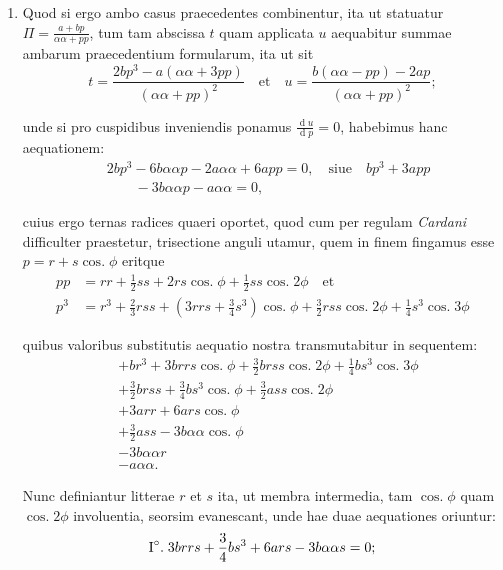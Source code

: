 \documentclass[10pt,a4paper]{article}
\DeclareMathOperator{\cosg}{cos.}
\begin{document}
\begin{paracol}{2}
\begin{enumerate}[topsep=1px]
		\item Quod si ergo ambo casus praecedentes combinentur, ita ut statuatur $\Pi=\frac{a + bp}{\alpha \alpha + pp}$, tum tam abscissa $t$ quam applicata $u$ aequabitur summae ambarum praecedentium formularum, ita ut sit
		\[
			t = \frac{2bp^3 - a(\alpha \alpha + 3pp)}{(\alpha \alpha + pp)^2} \quad \text{et} \quad u = \frac{b(\alpha \alpha - pp)-2ap}{(\alpha \alpha + pp)^2};
		\]
		\par unde si pro cuspidibus inveniendis ponamus $\frac{\operatorname{d}u}{\operatorname{d}p} = 0$, habebimus hanc aequationem:
		\begin{align*}
			&2bp^3-6b\alpha \alpha p -2a \alpha \alpha +6a pp = 0, \quad \text{siue} \quad bp^3+3app\\
			&\qquad-3b\alpha \alpha p - a\alpha \alpha = 0,
		\end{align*}
		\par cuius ergo ternas radices quaeri oportet, quod cum per regulam \textit{Cardani} difficulter praestetur, trisectione anguli utamur, quem in finem fingamus esse $p=r+s\cosg \phi$ eritque
		\begin{align*}
			pp & = rr + \frac{1}{2}ss +2rs \cosg\phi + \frac{1}{2}ss \cosg 2\phi \quad \text{et}\\
			p^3 & = r^3+\frac{2}{3}rss + (3rrs+\frac{3}{4}s^3)\cosg \phi + \frac{3}{2} rss \cosg 2\phi+\frac{1}{4}s^3\cosg 3\phi
		\end{align*}
		\par quibus valoribus substitutis aequatio nostra transmutabitur in sequentem:
		\begin{align*}
			&+br^3+3brrs \cosg \phi + \frac{3}{2}brss \cosg 2\phi+ \frac{1}{4}bs^3\cosg 3\phi\\
			&+\frac{3}{2}brss + \frac{3}{4}bs^3\cosg \phi + \frac{3}{2}ass \cosg 2\phi\\
			&+3arr + 6ars \cosg \phi\\
			&+\frac{3}{2}ass - 3b\alpha \alpha \cosg \phi\\
			&-3b\alpha \alpha r\\
			&-a \alpha \alpha.
		\end{align*}
		\par Nunc definiantur litterae $r$ et $s$ ita, ut membra intermedia, tam $\cosg \phi$ quam $\cosg 2\phi$ involuentia, seorsim evanescant, unde hae duae aequationes oriuntur:
		\begin{align*}
			\text{I}\degree.\; &3brrs + \frac{3}{4}bs^3+6ars-3b\alpha \alpha s = 0;\\

\end{align*}
\end{enumerate}
\end{paracol}
\end{document}
